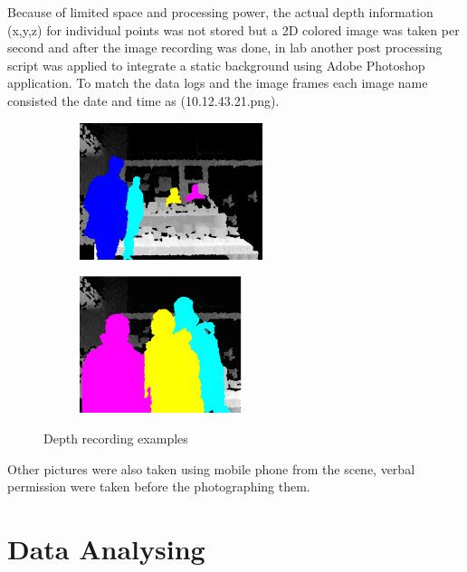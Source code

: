 \begin{enumerate}
Because of limited space and processing power, the actual depth information (x,y,z) for individual points was not stored but a 2D colored image was taken per second and after the image recording was done, in lab another post processing script was applied to integrate a static background using Adobe Photoshop application. To match the data logs and the image frames each image name consisted the date and time as (10.12.43.21.png).


\begin{figure}[H]
    \centering
    \begin{subfigure}[H]{0.45\textwidth}
        \centering
        \includegraphics[width=\textwidth,height=4cm]{Figures/8/d1}
        \caption{}
        \label{fig:d1}
    \end{subfigure}
    \hfill
    \begin{subfigure}[H]{0.45\textwidth}
        \centering
        \includegraphics[width=\textwidth,height=4cm]{Figures/8/d2}
        \caption{}
        \label{fig:d2}
    \end{subfigure}
    \caption{Depth recording examples}
    \label{fig:DepthRecordedImages}
\end{figure}




\end{enumerate}

Other pictures were also taken using mobile phone from the scene, verbal permission were taken before the photographing them.


\newpage
\section{Data Analysing}

